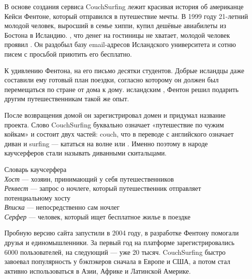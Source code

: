 В основе создания сервиса CouchSurfing лежит красивая история об американце Кейси Фентоне, который отправился в путешествие мечты. В 1999 году 21-летний молодой человек, выросший в семье хиппи, купил дешёвые авиабилеты из Бостона в Исландию. , что денег на гостиницы не хватает, молодой человек проявил . Он раздобыл базу email-адресов Исландского университета и  сотню писем с просьбой приютить его бесплатно.

К удивлению Фентона, на его письмо  десятки студентов. Добрые исландцы даже составили ему готовый план поездки, согласно которому он должен был перемещаться по стране от дома к дому.  исландским , Фентон решил подарить другим путешественникам такой же опыт.

После возвращения домой он зарегистрировал домен и придумал название проекта. Слово CouchSurfing буквально означает «путешествие по чужим койкам» и состоит двух частей: couch, что в переводе с английского означает диван и surfing — кататься на волне или . Именно поэтому в народе каучсерферов стали называть диванными скитальцами.

\begin{fancyquotes}
    Словарь каучсерфера\\

    \textit{Хост} — хозяин, принимающий у себя путешественников\\

    \textit{Реквест} — запрос о ночлеге, который путешественник отправляет потенциальному хосту\\

    \textit{Вписка} — непосредственно сам ночлег\\

    \textit{Серфер} — человек, который ищет бесплатное жилье в поездке
\end{fancyquotes}

Пробную версию сайта запустили в 2004 году, в разработке Фентону помогали друзья и единомышленники. За первый год на платформе зарегистрировались 6000 пользователей, на следующий — уже 20 тысяч. CouchSurfing быстро завоевал популярность у бэкпэкеров сначала в Европе и США, а потом стал активно использоваться в Азии, Африке и Латинской Америке.

